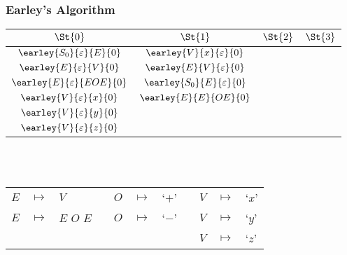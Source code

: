 \begin{frame}
	\frametitle{Earley's Algorithm}
	\centering
	\begin{tabular}{|c|c|c|c|}
		\hline
		$\St{0}$                          & $\St{1}$ & $\St{2}$ & $\St{3}$ \\
		\hline
		$\earley{S_0}{\varepsilon}{E}{0}$ & $\earley{V}{x}{\varepsilon}{0}$   &  & \\
		$\earley{E}{\varepsilon}{V}{0}$   & $\earley{E}{V}{\varepsilon}{0}$   &  & \\
		$\earley{E}{\varepsilon}{EOE}{0}$ & $\earley{S_0}{E}{\varepsilon}{0}$ &  & \\
		$\earley{V}{\varepsilon}{x}{0}$   & $\earley{E}{E}{OE}{0}$            &  & \\
		$\earley{V}{\varepsilon}{y}{0}$   &                                   &  & \\
		$\earley{V}{\varepsilon}{z}{0}$   &                                   &  & \\
		\hline
	\end{tabular}

	\\~\\
	\vspace{0.5cm}
	\scriptsize
	\begin{tabular}{rclcrclcrcl}
		$E$ & $ \mapsto $ & $V$         && $O$ & $ \mapsto $ & `$+$' && $V$ & $ \mapsto $ & `$x$' \\
		$E$ & $ \mapsto $ & $E$ $O$ $E$ && $O$ & $ \mapsto $ & `$-$' && $V$ & $ \mapsto $ & `$y$' \\
		    &             &             &&     &             &       && $V$ & $ \mapsto $ & `$z$'
	\end{tabular}
\end{frame}


